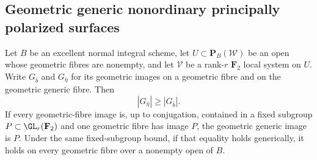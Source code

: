 

\subsection{Geometric generic nonordinary principally polarized surfaces}
\label{subsec:generic-nonordinary-ppav-groups-candidate}

\begin{lemma}
\label{lem:frame-components-specialization-candidate}
Let $B$ be an excellent normal integral scheme, let
$U\subset\mathbf P_B(\mathcal W)$ be an open whose geometric
fibres are nonempty, and let $\mathcal V$ be a rank-$r$
$\mathbf F_2$ local system on $U$. Write $G_{\bar b}$ and
$G_{\bar\eta}$ for its geometric images on a geometric fibre
and on the geometric generic fibre. Then
\[
                         |G_{\bar\eta}|\ge |G_{\bar b}|.
\]
If every geometric-fibre image is, up to conjugation, contained
in a fixed subgroup $P\subset\GL_r(\mathbf F_2)$ and one
geometric fibre has image $P$, the geometric generic image is
$P$. Under the same fixed-subgroup bound, if that equality
holds generically, it holds on every
geometric fibre over a nonempty open of $B$.
\end{lemma}

